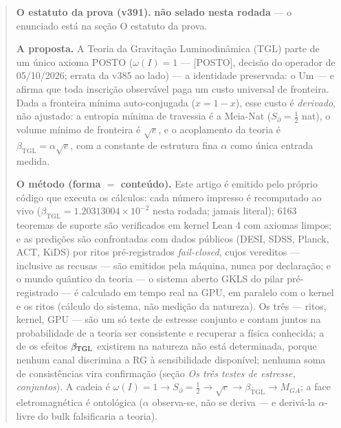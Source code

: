 \documentclass[11pt]{article}
\newcommand{\bTGL}{\beta_{\mathrm{TGL}}}\newcommand{\Msun}{M_{\odot}}\newcommand{\TGL}{\mathrm{TGL}}
\theoremstyle{definition}\newtheorem{deriv}{Derivação}
\begin{document}
\begin{abstract}

\textbf{O estatuto da prova (v391).} \textbf{não selado nesta rodada} --- o enunciado está na seção O estatuto da prova.

\textbf{A proposta.} A Teoria da Gravitação Luminodinâmica (TGL) parte de um único axioma \textsf{POSTO} ($\omega(I)=1$ --- \textsf{[POSTO]}, decisão do operador de 05/10/2026; errata da v385 ao lado) --- a identidade preservada: o Um --- e afirma que toda inscrição observável paga um custo universal de fronteira. Dada a fronteira mínima auto-conjugada ($x=1-x$), esse custo é \emph{derivado}, não ajustado: a entropia mínima de travessia é a Meia-Nat ($S_\partial=\tfrac12$ nat), o volume mínimo de fronteira é $\sqrt e$, e o acoplamento da teoria é $\bTGL=\alpha\sqrt e$, com a constante de estrutura fina $\alpha$ como única entrada medida.

\textbf{O método (forma $=$ conteúdo).} Este artigo é emitido pelo próprio código que executa os cálculos: cada número impresso é recomputado ao vivo ($\bTGL=1.20313004\times10^{-2}$ nesta rodada; jamais literal); 6163 teoremas de suporte são verificados em kernel Lean 4 com axiomas limpos; e as predições são confrontadas com dados públicos (DESI, SDSS, Planck, ACT, KiDS) por ritos pré-registrados \emph{fail-closed}, cujos vereditos --- inclusive as recusas --- são emitidos pela máquina, nunca por declaração; e o mundo quântico da teoria --- o sistema aberto GKLS do pilar pré-registrado --- é calculado em tempo real na GPU, em paralelo com o kernel e os ritos (cálculo do sistema, não medição da natureza). Os três --- ritos, kernel, GPU --- são um só teste de estresse conjunto e contam juntos na probabilidade de a teoria ser consistente e recuperar a física conhecida; a de os efeitos $\beta_{\rm TGL}$ existirem na natureza não está determinada, porque nenhum canal discrimina a RG à sensibilidade disponível; nenhuma soma de consistências vira confirmação (seção \emph{Os três testes de estresse, conjuntos}). A cadeia é $\omega(I)=1\to S_\partial=\tfrac12\to\sqrt e\to\bTGL\to M_{GA}$; a face eletromagnética é ontológica ($\alpha$ observa-se, não se deriva --- e derivá-la $\alpha$-livre do bulk falsificaria a teoria).


\end{abstract}
\end{document}
